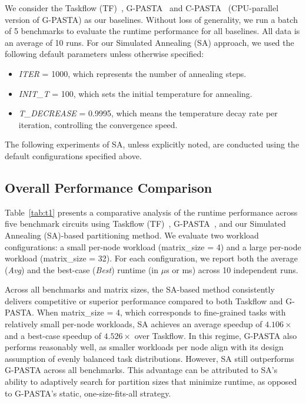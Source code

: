 \documentclass[9pt,conference]{IEEEtran}
\begin{document}
We consider the Taskflow (TF)~\cite{huang2021taskflow}, G-PASTA~\cite{zhang2024g} and C-PASTA~\cite{cpasta} (CPU-parallel version of G-PASTA) as our baselines.
Without loss of generality, we run a batch of 5 benchmarks to evaluate the runtime performance for all baselines. 
All data is an average of 10 runs.
For our Simulated Annealing (SA) approach, we used the following default parameters unless otherwise specified:
\begin{itemize}
\item \textit{ITER} = 1000, which represents the number of annealing steps.
\item \textit{INIT\_T} = 100, which sets the initial temperature for annealing.
\item \textit{T\_DECREASE} = 0.9995, which means the temperature decay rate per iteration, controlling the convergence speed.
\end{itemize}
The following experiments of SA, unless explicitly noted, are conducted using the default configurations specified above.


\subsection{Overall Performance Comparison}

Table~\ref{tab:t1} presents a comparative analysis of the runtime performance across five benchmark circuits using Taskflow (TF)~\cite{huang2021taskflow}, G-PASTA~\cite{zhang2024g}, and our Simulated Annealing (SA)-based partitioning method. 
We evaluate two workload configurations: a small per-node workload (matrix\_size = 4) and a large per-node workload (matrix\_size = 32). 
For each configuration, we report both the average (\textit{Avg}) and the best-case (\textit{Best}) runtime (in $\mu$s or ms) across 10 independent runs.

Across all benchmarks and matrix sizes, the SA-based method consistently delivers competitive or superior performance compared to both Taskflow and G-PASTA. 
When matrix\_size = 4, which corresponds to fine-grained tasks with relatively small per-node workloads, SA achieves an average speedup of $4.106\times$ and a best-case speedup of $4.526\times$ over Taskflow. 
In this regime, G-PASTA also performs reasonably well, as smaller workloads per node align with its design assumption of evenly balanced task distributions.
However, SA still outperforms G-PASTA across all benchmarks. 
This advantage can be attributed to SA’s ability to adaptively search for partition sizes that minimize runtime, as opposed to G-PASTA’s static, one-size-fits-all strategy.
\end{document}
